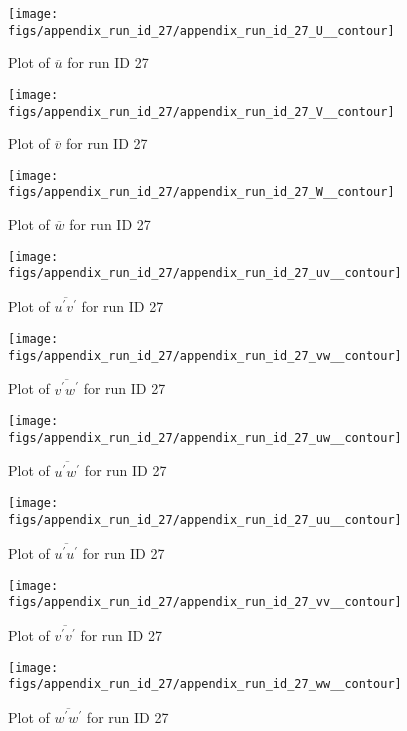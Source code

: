 \begin{figure}[H]
\centering
\texttt{[image: figs/appendix\_run\_id\_27/appendix\_run\_id\_27\_U\_\_contour]}
\caption{Plot of $\overline{u}$ for run ID 27}
\label{fig:appendix_run_id_27_U__contour}
\end{figure}


\begin{figure}[H]
\centering
\texttt{[image: figs/appendix\_run\_id\_27/appendix\_run\_id\_27\_V\_\_contour]}
\caption{Plot of $\overline{v}$ for run ID 27}
\label{fig:appendix_run_id_27_V__contour}
\end{figure}


\begin{figure}[H]
\centering
\texttt{[image: figs/appendix\_run\_id\_27/appendix\_run\_id\_27\_W\_\_contour]}
\caption{Plot of $\overline{w}$ for run ID 27}
\label{fig:appendix_run_id_27_W__contour}
\end{figure}


\begin{figure}[H]
\centering
\texttt{[image: figs/appendix\_run\_id\_27/appendix\_run\_id\_27\_uv\_\_contour]}
\caption{Plot of $\overline{u^\prime v^\prime}$ for run ID 27}
\label{fig:appendix_run_id_27_uv__contour}
\end{figure}


\begin{figure}[H]
\centering
\texttt{[image: figs/appendix\_run\_id\_27/appendix\_run\_id\_27\_vw\_\_contour]}
\caption{Plot of $\overline{v^\prime w^\prime}$ for run ID 27}
\label{fig:appendix_run_id_27_vw__contour}
\end{figure}


\begin{figure}[H]
\centering
\texttt{[image: figs/appendix\_run\_id\_27/appendix\_run\_id\_27\_uw\_\_contour]}
\caption{Plot of $\overline{u^\prime w^\prime}$ for run ID 27}
\label{fig:appendix_run_id_27_uw__contour}
\end{figure}


\begin{figure}[H]
\centering
\texttt{[image: figs/appendix\_run\_id\_27/appendix\_run\_id\_27\_uu\_\_contour]}
\caption{Plot of $\overline{u^\prime u^\prime}$ for run ID 27}
\label{fig:appendix_run_id_27_uu__contour}
\end{figure}


\begin{figure}[H]
\centering
\texttt{[image: figs/appendix\_run\_id\_27/appendix\_run\_id\_27\_vv\_\_contour]}
\caption{Plot of $\overline{v^\prime v^\prime}$ for run ID 27}
\label{fig:appendix_run_id_27_vv__contour}
\end{figure}


\begin{figure}[H]
\centering
\texttt{[image: figs/appendix\_run\_id\_27/appendix\_run\_id\_27\_ww\_\_contour]}
\caption{Plot of $\overline{w^\prime w^\prime}$ for run ID 27}
\label{fig:appendix_run_id_27_ww__contour}
\end{figure}


